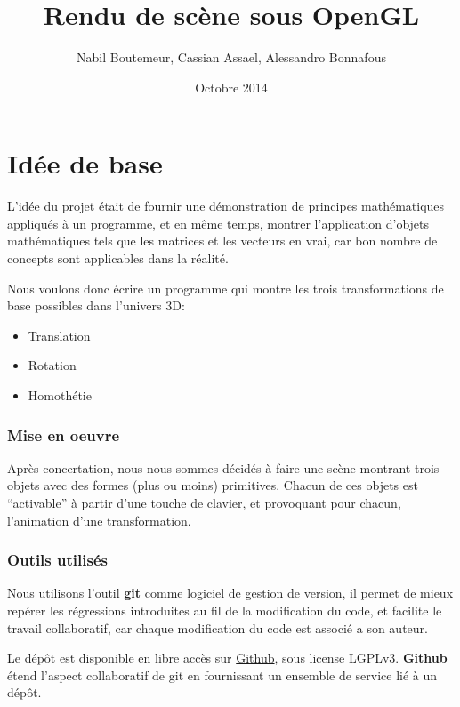 \documentclass[11pt, a4paper, titlepage]{article}
\begin{document}
\title{Rendu de scène sous OpenGL} \author{Nabil Boutemeur, Cassian
  Assael, Alessandro Bonnafous} \date{Octobre 2014}
\maketitle

\setcounter{tocdepth}{4}

\tableofcontents
\pagebreak

\part{Idée de base}
L'idée du projet était de fournir une démonstration de principes
mathématiques appliqués à un programme, et en même temps, montrer
l'application d'objets mathématiques tels que les matrices et les
vecteurs en vrai, car bon nombre de concepts sont applicables dans la
réalité.

Nous voulons donc écrire un programme qui montre les trois
transformations de base possibles dans l'univers 3D:
\begin{itemize}
\item Translation
\item Rotation
\item Homothétie
\end{itemize}
\section{Mise en oeuvre}

Après concertation, nous nous sommes décidés à faire une scène
montrant trois objets avec des formes (plus ou moins) primitives.
Chacun de ces objets est ``activable'' à partir d'une touche de
clavier, et provoquant pour chacun, l'animation d'une transformation.
\pagebreak

\section{Outils utilisés}

Nous utilisons l'outil \textbf{git} comme logiciel de gestion de
version, il permet de mieux repérer les régressions introduites au fil
de la modification du code, et facilite le travail collaboratif, car
chaque modification du code est associé a son auteur.

Le dépôt est disponible en libre accès sur
\href{https://github.com/nbouteme/OpenGL-Demo}{{\color{blue}Github}},
sous license LGPLv3.  \textbf{Github} étend l'aspect collaboratif de
git en fournissant un ensemble de service lié à un dépôt.
\end{document}

